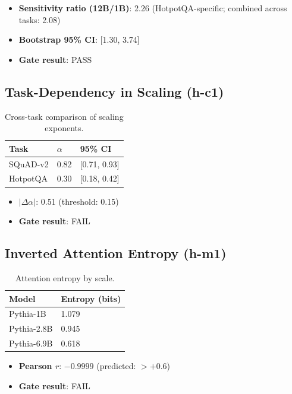 \begin{itemize}
    \item \textbf{Sensitivity ratio (12B/1B)}: 2.26 (HotpotQA-specific; combined across tasks: 2.08)
    \item \textbf{Bootstrap 95\% CI}: [1.30, 3.74]
    \item \textbf{Gate result}: PASS
\end{itemize}

\subsection{Task-Dependency in Scaling (h-c1)}

\begin{table}[h]
\centering
\begin{tabular}{lll}
\toprule
\textbf{Task} & $\alpha$ & \textbf{95\% CI} \\
\midrule
SQuAD-v2 & 0.82 & [0.71, 0.93] \\
HotpotQA & 0.30 & [0.18, 0.42] \\
\bottomrule
\end{tabular}
\caption{Cross-task comparison of scaling exponents.}
\label{tab:cross_task}
\end{table}

\begin{itemize}
    \item $|\Delta\alpha|$: 0.51 (threshold: 0.15)
    \item \textbf{Gate result}: FAIL
\end{itemize}

\subsection{Inverted Attention Entropy (h-m1)}

\begin{table}[h]
\centering
\begin{tabular}{ll}
\toprule
\textbf{Model} & \textbf{Entropy (bits)} \\
\midrule
Pythia-1B & 1.079 \\
Pythia-2.8B & 0.945 \\
Pythia-6.9B & 0.618 \\
\bottomrule
\end{tabular}
\caption{Attention entropy by scale.}
\label{tab:entropy}
\end{table}

\begin{itemize}
    \item \textbf{Pearson $r$}: $-0.9999$ (predicted: $> +0.6$)
    \item \textbf{Gate result}: FAIL
\end{itemize}

